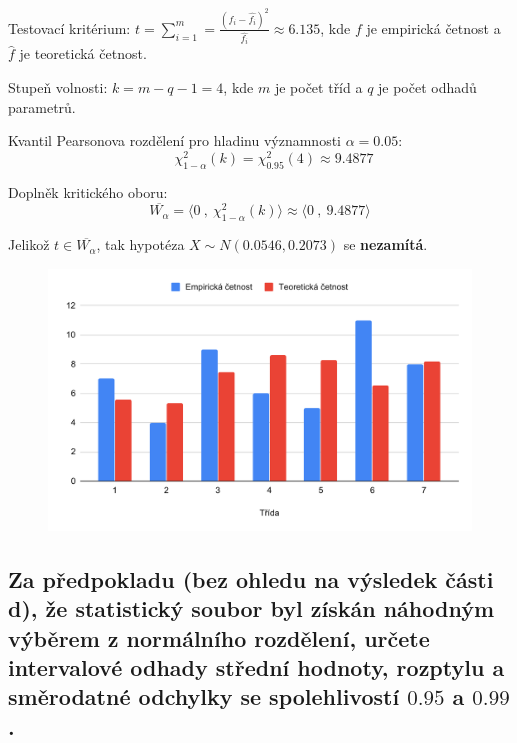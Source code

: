 \begin{compactitem}
    \item Testovací kritérium: ${\displaystyle t = \sum_{i=1}^{m} = \frac{(f_i - \hat{f_i})^2}{\hat{f_i}} \approx 6.135}$, kde $f$ je empirická četnost a $\hat{f}$ je teoretická četnost.

    \item Stupeň volnosti: ${\displaystyle k = m - q - 1 = 4}$, kde $m$ je počet tříd a $q$ je počet odhadů parametrů.

    \item Kvantil Pearsonova rozdělení pro hladinu významnosti ${\displaystyle \alpha = 0.05}$:
    $${\displaystyle \qquad \chi_{1 - \alpha}^2(k) = \chi_{0.95}^2(4) \approx 9.4877}$$

    \item Doplněk kritického oboru:
    $${\displaystyle \overline{W_\alpha} = \big\langle 0 ~,~ \chi_{1 - \alpha}^2(k) \big\rangle \approx \big\langle 0 ~,~ 9.4877 \big\rangle}$$

    \item Jelikož ${\displaystyle t \in \overline{W_\alpha}}$, tak hypotéza ${\displaystyle X \sim N(0.0546, 0.2073)}$ se \textbf{nezamítá}.
\end{compactitem}

\begin{figure}[H]
    \centering
    \includegraphics[width=1\linewidth]{1-d-3.pdf}
\end{figure}


\subsection{Za předpokladu (bez ohledu na výsledek části d), že statistický soubor byl získán náhodným výběrem z normálního rozdělení, určete intervalové odhady střední hodnoty, rozptylu a směrodatné odchylky se spolehlivostí $0.95$ a $0.99$.}

